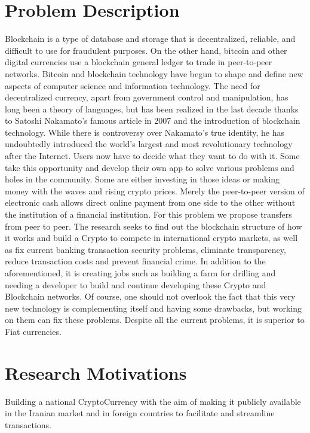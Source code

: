 
\section{Problem Description}
Blockchain is a type of database and storage that is decentralized, reliable, and difficult to use for fraudulent purposes. On the other hand, bitcoin and other digital currencies use a blockchain general ledger to trade in peer-to-peer networks.
Bitcoin and blockchain technology have begun to shape and define new aspects of computer science and information technology. The need for decentralized currency, apart from government control and manipulation, has long been a theory of languages, but has been realized in the last decade thanks to Satoshi Nakamato's famous article in 2007 and the introduction of blockchain technology.
While there is controversy over Nakamato's true identity, he has undoubtedly introduced the world's largest and most revolutionary technology after the Internet. Users now have to decide what they want to do with it. Some take this opportunity and develop their own app to solve various problems and holes in the community. Some are either investing in those ideas or making money with the waves and rising crypto prices.
Merely the peer-to-peer version of electronic cash allows direct online payment from one side to the other without the institution of a financial institution. For this problem we propose transfers from peer to peer.
The research seeks to find out the blockchain structure of how it works and build a Crypto to compete in international crypto markets, as well as fix current banking transaction security problems, eliminate transparency, reduce transaction costs and prevent financial crime. In addition to the aforementioned, it is creating jobs such as building a farm for drilling and needing a developer to build and continue developing these Crypto and Blockchain networks. Of course, one should not overlook the fact that this very new technology is complementing itself and having some drawbacks, but working on them can fix these problems. Despite all the current problems, it is superior to Fiat currencies.

\section{Research Motivations}
Building a national CryptoCurrency with the aim of making it publicly available in the Iranian market and in foreign countries to facilitate and streamline transactions.

